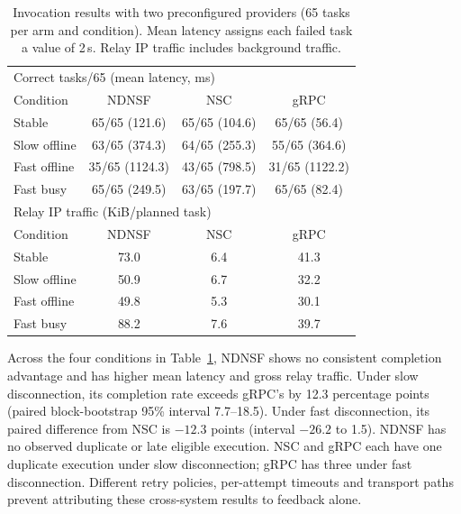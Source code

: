 \begin{table}[!ht]
  \centering
  \caption{Invocation results with two preconfigured providers (65 tasks per arm and condition). Mean latency assigns each failed task a value of 2\,s. Relay IP traffic includes background traffic.}
  \label{tab:matched-provider-availability}
  \footnotesize
  \setlength{\tabcolsep}{2.5pt}
  \begin{tabular}{lccc}
    \toprule
    \multicolumn{4}{l}{Correct tasks/65 (mean latency, ms)} \\
    Condition & NDNSF & NSC & gRPC \\
    \midrule
    Stable & 65/65 (121.6) & 65/65 (104.6) & 65/65 (56.4) \\
    Slow offline & 63/65 (374.3) & 64/65 (255.3) & 55/65 (364.6) \\
    Fast offline & 35/65 (1124.3) & 43/65 (798.5) & 31/65 (1122.2) \\
    Fast busy & 65/65 (249.5) & 63/65 (197.7) & 65/65 (82.4) \\
    \midrule
    \multicolumn{4}{l}{Relay IP traffic (KiB/planned task)} \\
    Condition & NDNSF & NSC & gRPC \\
    \midrule
    Stable & 73.0 & 6.4 & 41.3 \\
    Slow offline & 50.9 & 6.7 & 32.2 \\
    Fast offline & 49.8 & 5.3 & 30.1 \\
    Fast busy & 88.2 & 7.6 & 39.7 \\
    \bottomrule
  \end{tabular}
\end{table}

Across the four conditions in Table~\ref{tab:matched-provider-availability}, NDNSF shows no consistent completion advantage and has higher mean latency and gross relay traffic. Under slow disconnection, its completion rate exceeds gRPC's by 12.3 percentage points (paired block-bootstrap 95\% interval 7.7--18.5). Under fast disconnection, its paired difference from NSC is $-12.3$ points (interval $-26.2$ to 1.5). NDNSF has no observed duplicate or late eligible execution. NSC and gRPC each have one duplicate execution under slow disconnection; gRPC has three under fast disconnection. Different retry policies, per-attempt timeouts and transport paths prevent attributing these cross-system results to feedback alone.

